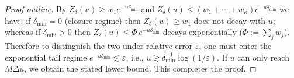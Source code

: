 \begin{proof}[Proof outline]
By \(Z_\delta(u)\ge w_1e^{-u\delta_{\min}}\) and \(Z_\delta(u)\le (w_1+\cdots+w_\kappa)e^{-u\delta_{\min}}\) we have: if \(\delta_{\min}=0\) (closure regime) then \(Z_\delta(u)\ge w_1\) does not decay with \(u\); whereas if \(\delta_{\min}>0\) then \(Z_\delta(u)\le \Phi\,e^{-u\delta_{\min}}\) decays exponentially (\(\Phi:=\sum_j w_j\)).
Therefore to distinguish the two under relative error \(\varepsilon\), one must enter the exponential tail regime \(e^{-u\delta_{\min}}\lesssim\varepsilon\), i.e., \(u\gtrsim \delta_{\min}^{-1}\log(1/\varepsilon)\).
If \(u\) can only reach \(M\Delta u\), we obtain the stated lower bound. This completes the proof.
\end{proof}
\endinput






